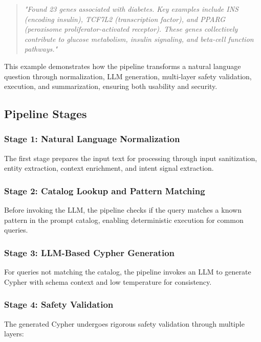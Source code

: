 \documentclass[a4paper,twoside]{sapthesis}
\begin{document}
\begin{quote}
\textit{"Found 23 genes associated with diabetes. Key examples include INS (encoding insulin), TCF7L2 (transcription factor), and PPARG (peroxisome proliferator-activated receptor). These genes collectively contribute to glucose metabolism, insulin signaling, and beta-cell function pathways."}
\end{quote}

This example demonstrates how the pipeline transforms a natural language question through normalization, LLM generation, multi-layer safety validation, execution, and summarization, ensuring both usability and security.

\subsection{Pipeline Stages}
\label{subsec:pipeline-stages}

\subsubsection{Stage 1: Natural Language Normalization}

The first stage prepares the input text for processing through input sanitization, entity extraction, context enrichment, and intent signal extraction.

\subsubsection{Stage 2: Catalog Lookup and Pattern Matching}

Before invoking the LLM, the pipeline checks if the query matches a known pattern in the prompt catalog, enabling deterministic execution for common queries.

\subsubsection{Stage 3: LLM-Based Cypher Generation}

For queries not matching the catalog, the pipeline invokes an LLM to generate Cypher with schema context and low temperature for consistency.

\subsubsection{Stage 4: Safety Validation}

The generated Cypher undergoes rigorous safety validation through multiple layers:
\end{document}
